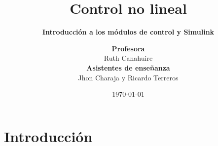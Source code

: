 

\title[Laboratorio 0]{Control no lineal}
\subtitle{\textbf{Introducción a los módulos de control y Simulink}}

\author[J. Charaja and R. Terreros (UTEC)]{\textbf {Profesora} \\ Ruth Canahuire \\ \vspace{1em} \textbf{Asistentes de enseñanza} \\ Jhon Charaja y Ricardo Terreros}


\date{\today}



\graphicspath{{imgs/}}
\frame{\titlepage}





\section{Introducción}

